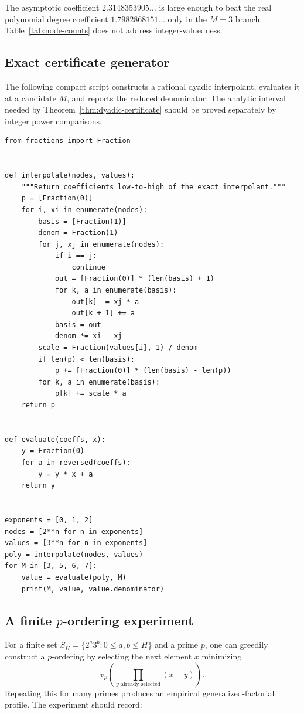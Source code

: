 \documentclass[11pt,oneside]{article}
\theoremstyle{definition}
\theoremstyle{remark}
\begin{document}
The asymptotic coefficient $2.3148353905\ldots$ is large enough to beat the real polynomial
degree coefficient $1.7982868151\ldots$ only in the $M=3$ branch.  Table~\ref{tab:node-counts}
does not address integer-valuedness.

\subsection{Exact certificate generator}

The following compact script constructs a rational dyadic interpolant, evaluates it at a
candidate $M$, and reports the reduced denominator.  The analytic interval needed by
Theorem~\ref{thm:dyadic-certificate} should be proved separately by integer power comparisons.

\begin{lstlisting}[style=pythonstyle,caption={Exact dyadic interpolation certificate generator.}]
from fractions import Fraction


def interpolate(nodes, values):
    """Return coefficients low-to-high of the exact interpolant."""
    p = [Fraction(0)]
    for i, xi in enumerate(nodes):
        basis = [Fraction(1)]
        denom = Fraction(1)
        for j, xj in enumerate(nodes):
            if i == j:
                continue
            out = [Fraction(0)] * (len(basis) + 1)
            for k, a in enumerate(basis):
                out[k] -= xj * a
                out[k + 1] += a
            basis = out
            denom *= xi - xj
        scale = Fraction(values[i], 1) / denom
        if len(p) < len(basis):
            p += [Fraction(0)] * (len(basis) - len(p))
        for k, a in enumerate(basis):
            p[k] += scale * a
    return p


def evaluate(coeffs, x):
    y = Fraction(0)
    for a in reversed(coeffs):
        y = y * x + a
    return y


exponents = [0, 1, 2]
nodes = [2**n for n in exponents]
values = [3**n for n in exponents]
poly = interpolate(nodes, values)
for M in [3, 5, 6, 7]:
    value = evaluate(poly, M)
    print(M, value, value.denominator)
\end{lstlisting}

\subsection{A finite $p$-ordering experiment}

For a finite set $S_H=\{2^a3^b:0\le a,b\le H\}$ and a prime $p$, one can greedily construct
a $p$-ordering by selecting the next element $x$ minimizing
\[
 v_p\!\left(\prod_{y\text{ already selected}}(x-y)\right).
\]
Repeating this for many primes produces an empirical generalized-factorial profile.  The
experiment should record:
\end{document}
